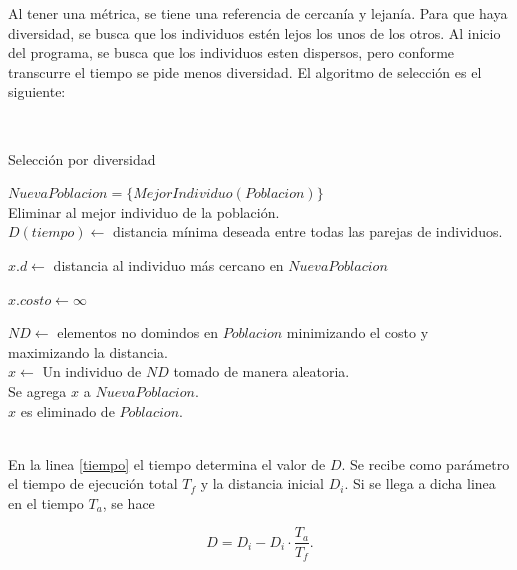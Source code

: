 \documentclass[10pt,a4paper]{article}
\begin{document}
\noindent Al tener una métrica, se tiene una referencia de cercanía y lejanía. Para que haya diversidad, se busca que los individuos estén lejos los unos de los otros. Al inicio del programa, se busca que los individuos esten dispersos, pero conforme transcurre el tiempo se pide menos diversidad. El algoritmo de selección es el siguiente:

\ \\

\begin{algorithm}[H] %
\caption{Selección por diversidad} 
\label{algoritmo2}
\SetAlgoLined

$NuevaPoblacion = \{ MejorIndividuo(Poblacion) \}$ \\
Eliminar al mejor individuo de la población. \\
$D(tiempo) \leftarrow $ distancia mínima deseada entre todas las parejas de individuos. \\ \label{tiempo}


 { 

	 {
		$x.d \leftarrow $ distancia al individuo más cercano en $NuevaPoblacion$ \label{distancias}
		
		 {
			$x.costo \leftarrow \infty$		
		
		}		
		
	}

	$ND \leftarrow$ elementos no domindos en $Poblacion$ minimizando el costo y maximizando la distancia. \\
	$x \leftarrow $ Un individuo de $ND$ tomado de manera aleatoria. \\
	Se agrega $x$ a $NuevaPoblacion$.\\
	$x$ es eliminado de $Poblacion$.
	


}


\end{algorithm}

\ \\

\noindent En la linea \ref{tiempo} el tiempo determina el valor de $D$. Se recibe como parámetro el tiempo de ejecución total $T_f$ y la distancia inicial $D_i$. Si se llega a dicha linea en el tiempo $T_a$, se hace

\begin{equation*}
D = D_i - D_i \cdot \dfrac{T_a}{T_f}.
\end{equation*}
\end{document}
